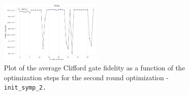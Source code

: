 \begin{figure}
    \centering
    \includegraphics[width=0.45\textwidth]{figures/png/RB_optimization/NM/InitialSymplex/20241113_181711/fidelity.png}
    \caption{Plot of the average Clifford gate fidelity as a function of the optimization steps for the second round optimization - \tt{init\_symp\_2}.}
    \label{fig:20241113_181711:fidelity}
\end{figure}

